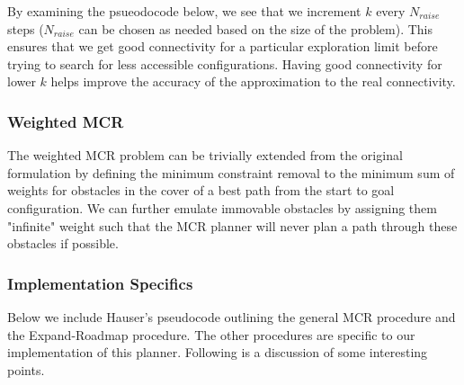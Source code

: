 By examining the psueodocode below, we see that we increment $k$ every $N_{raise}$ steps ($N_{raise}$ can be chosen as needed based on the size of the problem). This ensures that we get good connectivity for a particular exploration limit before trying to search for less accessible configurations. Having good connectivity for lower $k$ helps improve the accuracy of the approximation to the real connectivity. 

\subsubsection{Weighted MCR}
The weighted MCR problem can be trivially extended from the original formulation by defining the minimum constraint removal to the minimum sum of weights for obstacles in the cover of a best path from the start to goal configuration. We can further emulate immovable obstacles by assigning them "infinite" weight such that the MCR planner will never plan a path through these obstacles if possible. 

\subsubsection{Implementation Specifics}
Below we include Hauser's pseudocode outlining the general MCR procedure and the Expand-Roadmap procedure. The other procedures are specific to our implementation of this planner. Following is a discussion of some interesting points.


